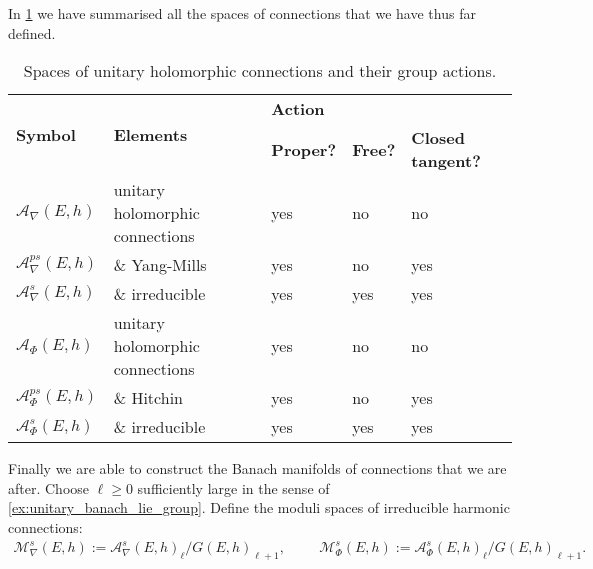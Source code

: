 \documentclass[12pt]{ociamthesis}  %
\begin{document}
In \ref{table:unitary_connection_spaces} we have summarised all the spaces
of connections that we have thus far defined.
\begin{table}[]\label{table:unitary_connection_spaces}
  \begin{tabular}{|l|l|lll|}
    \hline
    \multirow{2}{*}{\textbf{Symbol}} & \multirow{2}{*}{\textbf{Elements}} & \multicolumn{3}{l|}{\textbf{Action}}                                                                   \\ \cline{3-5}
                                     &                                    & \multicolumn{1}{l|}{\textbf{Proper?}} & \multicolumn{1}{l|}{\textbf{Free?}} & \textbf{Closed tangent?} \\ \hline
    $\mathcal A_\nabla(E,h)$         & unitary holomorphic connections    & \multicolumn{1}{l|}{yes}              & \multicolumn{1}{l|}{no}             & no                       \\ \hline
    $\mathcal A^{ps}_\nabla(E,h)$    & \& Yang-Mills                      & \multicolumn{1}{l|}{yes}              & \multicolumn{1}{l|}{no}             & yes                      \\ \hline
    $\mathcal A^s_\nabla(E,h)$       & \& irreducible                     & \multicolumn{1}{l|}{yes}              & \multicolumn{1}{l|}{yes}            & yes                      \\ \hline
    $\mathcal A_\Phi(E,h)$           & unitary holomorphic connections    & \multicolumn{1}{l|}{yes}              & \multicolumn{1}{l|}{no}             & no                       \\ \hline
    $\mathcal A^{ps}_\Phi(E,h)$      & \& Hitchin                         & \multicolumn{1}{l|}{yes}              & \multicolumn{1}{l|}{no}             & yes                      \\ \hline
    $\mathcal A^s_\Phi(E,h)$         & \& irreducible                     & \multicolumn{1}{l|}{yes}              & \multicolumn{1}{l|}{yes}            & yes                      \\ \hline
  \end{tabular}
  \caption{Spaces of unitary holomorphic connections and their group actions.}
\end{table}
Finally we are able to construct the Banach manifolds of connections
that we are after. Choose $\ell \geq 0$ sufficiently large in the
sense of \ref{ex:unitary_banach_lie_group}. Define the moduli spaces
of irreducible harmonic connections:
\begin{align*}
  \mathcal M^s_\nabla(E,h) := \mathcal A^s_\nabla(E,h)_\ell/G(E,h)_{\ell + 1}, \hspace{1cm}
  \mathcal M^s_\Phi(E,h) := \mathcal A^s_\Phi(E,h)_\ell/G(E,h)_{\ell + 1}.
\end{align*}
\end{document}
